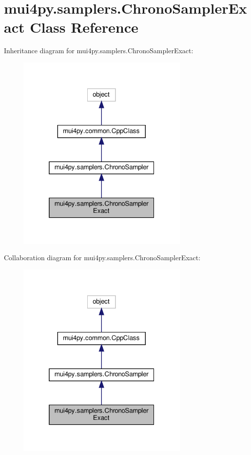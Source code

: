 \hypertarget{classmui4py_1_1samplers_1_1_chrono_sampler_exact}{}\section{mui4py.\+samplers.\+Chrono\+Sampler\+Exact Class Reference}
\label{classmui4py_1_1samplers_1_1_chrono_sampler_exact}


Inheritance diagram for mui4py.\+samplers.\+Chrono\+Sampler\+Exact\+:
\nopagebreak
\begin{figure}[H]
\begin{center}
\leavevmode
\includegraphics[width=241pt]{classmui4py_1_1samplers_1_1_chrono_sampler_exact__inherit__graph}
\end{center}
\end{figure}


Collaboration diagram for mui4py.\+samplers.\+Chrono\+Sampler\+Exact\+:
\nopagebreak
\begin{figure}[H]
\begin{center}
\leavevmode
\includegraphics[width=241pt]{classmui4py_1_1samplers_1_1_chrono_sampler_exact__coll__graph}
\end{center}
\end{figure}
